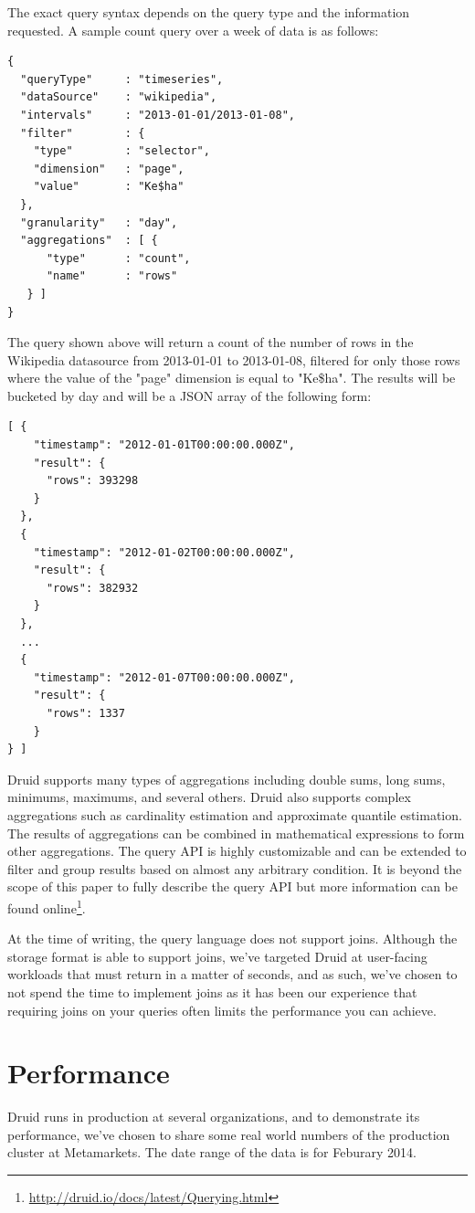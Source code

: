 \documentclass{acm_proc_article-sp}
\begin{document}
The exact query syntax depends on the query type and the information requested.
A sample count query over a week of data is as follows:
\newpage
\begin{verbatim}
{
  "queryType"     : "timeseries",
  "dataSource"    : "wikipedia",
  "intervals"     : "2013-01-01/2013-01-08",
  "filter"        : {
    "type"        : "selector",
    "dimension"   : "page",
    "value"       : "Ke$ha"
  },
  "granularity"   : "day",
  "aggregations"  : [ {
      "type"      : "count",
      "name"      : "rows"
   } ]
}
\end{verbatim}
The query shown above will return a count of the number of rows in the Wikipedia datasource
from 2013-01-01 to 2013-01-08, filtered for only those rows where the value of the "page" dimension is 
equal to "Ke\$ha". The results will be bucketed by day and will be a JSON array of the following form:
\begin{verbatim}
[ {
    "timestamp": "2012-01-01T00:00:00.000Z",
    "result": {
      "rows": 393298
    }
  },
  {
    "timestamp": "2012-01-02T00:00:00.000Z",
    "result": {
      "rows": 382932
    }
  },
  ...
  {
    "timestamp": "2012-01-07T00:00:00.000Z",
    "result": {
      "rows": 1337
    }
} ]
\end{verbatim}
Druid supports many types of aggregations including double sums, long sums,
minimums, maximums, and several others. Druid also supports complex aggregations
such as cardinality estimation and approximate quantile estimation.  The
results of aggregations can be combined in mathematical expressions to form
other aggregations. The query API is highly customizable and can be extended to
filter and group results based on almost any arbitrary condition.  It is beyond
the scope of this paper to fully describe the query API but more information
can be found
online\footnote{\href{http://druid.io/docs/latest/Querying.html}{http://druid.io/docs/latest/Querying.html}}.

At the time of writing, the query language does not support joins. Although the
storage format is able to support joins, we've targeted Druid at user-facing
workloads that must return in a matter of seconds, and as such, we've chosen to
not spend the time to implement joins as it has been our experience that
requiring joins on your queries often limits the performance you can achieve.

\newpage
\section{Performance}
\label{sec:benchmarks}
Druid runs in production at several organizations, and to demonstrate its
performance, we've chosen to share some real world numbers of the production
cluster at Metamarkets. The date range of the data is for Feburary 2014.
\end{document}
